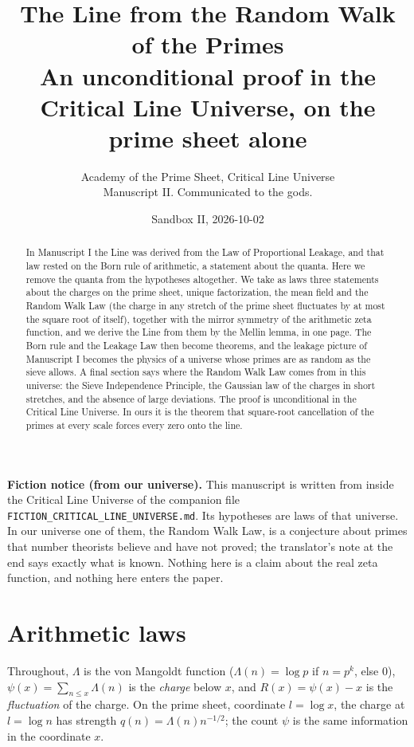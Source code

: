 \documentclass[11pt]{article}
\title{\textbf{The Line from the Random Walk of the Primes}\\[4pt]\large An unconditional proof in the Critical Line Universe, on the prime sheet alone}
\author{Academy of the Prime Sheet, Critical Line Universe\\ \small Manuscript II. Communicated to the gods.}
\date{Sandbox II, 2026-10-02}
\theoremstyle{definition}
\theoremstyle{remark}
\newcommand{\ps}{\psi}
\begin{document}
\maketitle

\begin{mdframed}[backgroundcolor=black!4,linewidth=0.4pt]
\small\textbf{Fiction notice (from our universe).} This manuscript is written from inside the Critical Line Universe of the companion file \texttt{FICTION\_CRITICAL\_LINE\_UNIVERSE.md}. Its hypotheses are laws of that universe. In our universe one of them, the Random Walk Law, is a conjecture about primes that number theorists believe and have not proved; the translator's note at the end says exactly what is known. Nothing here is a claim about the real zeta function, and nothing here enters the paper.
\end{mdframed}

\begin{abstract}
In Manuscript I the Line was derived from the Law of Proportional Leakage, and that law rested on the Born rule of arithmetic, a statement about the quanta. Here we remove the quanta from the hypotheses altogether. We take as laws three statements about the charges on the prime sheet, unique factorization, the mean field and the Random Walk Law (the charge in any stretch of the prime sheet fluctuates by at most the square root of itself), together with the mirror symmetry of the arithmetic zeta function, and we derive the Line from them by the Mellin lemma, in one page. The Born rule and the Leakage Law then become theorems, and the leakage picture of Manuscript I becomes the physics of a universe whose primes are as random as the sieve allows. A final section says where the Random Walk Law comes from in this universe: the Sieve Independence Principle, the Gaussian law of the charges in short stretches, and the absence of large deviations. The proof is unconditional in the Critical Line Universe. In ours it is the theorem that square-root cancellation of the primes at every scale forces every zero onto the line.
\end{abstract}

\section{Arithmetic laws}

Throughout, $\Lambda$ is the von Mangoldt function ($\Lambda(n)=\log p$ if $n=p^k$, else $0$), $\ps(x)=\sum_{n\le x}\Lambda(n)$ is the \emph{charge} below $x$, and $R(x)=\ps(x)-x$ is the \emph{fluctuation} of the charge. On the prime sheet, coordinate $l=\log x$, the charge at $l=\log n$ has strength $q(n)=\Lambda(n)n^{-1/2}$; the count $\ps$ is the same information in the coordinate $x$.
\end{document}
